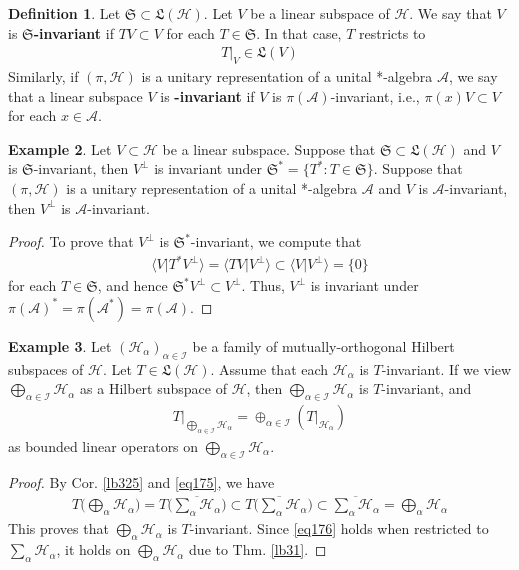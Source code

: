 \documentclass[12pt,b5paper,notitlepage]{article}
\theoremstyle{definition}
\newtheorem{df}{Definition}[subsection]
\newtheorem{eg}[df]{Example}
\theoremstyle{plain}
\newcommand{\fk}{\mathfrak}
\newcommand{\ovl}{\overline}
\newcommand{\bk}[1]{\langle {#1}\rangle}
\newcommand{\scr}{\mathscr}
\newcommand{\MH}{\mathcal H}
\newcommand{\SI}{\mathscr I}
\newcommand{\SA}{\mathscr A}
\numberwithin{equation}{section}
\begin{document}
\begin{df}
Let $\fk S\subset\fk L(\MH)$. Let $V$ be a linear subspace of $\MH$. We say that $V$ is \textbf{$\pmb{\fk S}$-invariant}  if $TV\subset V$ for each $T\in\fk S$. In that case, $T$ restricts to
\begin{align*}
T|_V\in\fk L(V)
\end{align*}
Similarly, if $(\pi,\MH)$ is a unitary representation of a unital *-algebra $\scr A$, we say that a linear subspace $V$ is \textbf{\pmb{$\scr A$}-invariant} if $V$ is $\pi(\scr A)$-invariant, i.e., $\pi(x)V\subset V$ for each $x\in\scr A$.
\end{df}


\begin{eg}\label{lb328}
Let $V\subset\MH$ be a linear subspace. Suppose that $\fk S\subset\fk L(\MH)$ and $V$ is $\fk S$-invariant, then $V^\perp$ is invariant under $\fk S^*=\{T^*:T\in\fk S\}$. Suppose that $(\pi,\MH)$ is a unitary representation of a unital *-algebra $\scr A$ and $V$ is $\scr A$-invariant, then $V^\perp$ is $\scr A$-invariant.
\end{eg}


\begin{proof}
To prove that $V^\perp$ is $\fk S^*$-invariant, we compute that
\begin{align*}
\bk{V|T^*V^\perp}=\bk{TV|V^\perp}\subset\bk{V|V^\perp}=\{0\}
\end{align*}
for each $T\in\fk S$, and hence $\fk S^*V^\perp\subset V^\perp$. Thus, $V^\perp$ is invariant under $\pi(\scr A)^*=\pi(\SA^*)=\pi(\SA)$.
\end{proof}


\begin{eg}\label{lb326}
Let $(\MH_\alpha)_{\alpha\in\SI}$ be a family of mutually-orthogonal Hilbert subspaces of $\MH$. Let $T\in\fk L(\MH)$. Assume that each $\MH_\alpha$ is $T$-invariant. If we view $\bigoplus_{\alpha\in\SI}\MH_\alpha$ as a Hilbert subspace of $\MH$, then $\bigoplus_{\alpha\in\SI}\MH_\alpha$ is $T$-invariant, and
\begin{align}\label{eq176}
T\big|_{\bigoplus_{\alpha\in\SI}\MH_\alpha}=\oplus_{\alpha\in\SI}(T|_{\MH_\alpha})
\end{align}
as bounded linear operators on $\bigoplus_{\alpha\in\SI}\MH_\alpha$.
\end{eg}

\begin{proof}
By Cor. \ref{lb325} and \eqref{eq175}, we have
\begin{align*}
T\Big(\bigoplus_\alpha\MH_\alpha\Big)=T\Big(\ovl{\sum_\alpha\MH_\alpha}\Big)\subset \ovl{T\Big(\sum_\alpha\MH_\alpha\Big)}\subset\ovl{\sum_\alpha\MH_\alpha}=\bigoplus_\alpha\MH_\alpha
\end{align*}
This proves that $\bigoplus_\alpha\MH_\alpha$ is $T$-invariant. Since \eqref{eq176} holds when restricted to $\sum_\alpha\MH_\alpha$, it holds on $\bigoplus_\alpha\MH_\alpha$ due to Thm. \ref{lb31}.
\end{proof}
\end{document}
